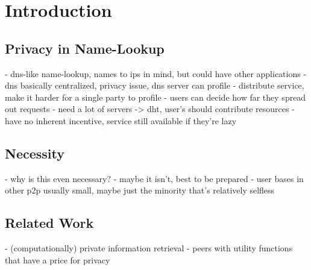 \chapter{Introduction}
\section{Privacy in Name-Lookup}
- dns-like name-lookup, names to ips in mind, but could have other applications
- dns basically centralized, privacy issue, dns server can profile
- distribute service, make it harder for a single party to profile
- users can decide how far they spread out requests
- need a lot of servers -> dht, user's should contribute resources
- have no inherent incentive, service still available if they're lazy

\section{Necessity}
- why is this even necessary?
- maybe it isn't, best to be prepared
- user bases in other p2p usually small, maybe just the minority that's
  relatively selfless

\section{Related Work}
- (computationally) private information retrieval
- peers with utility functions that have a price for privacy
